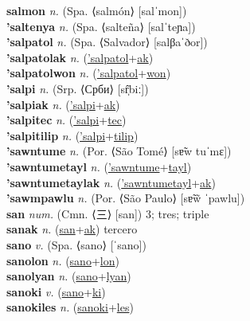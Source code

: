\textbf{salmon} \textit{n.} (Spa. ⟨salmón⟩ [salˈmon])
 \label{salmon} \\
\textbf{'saltenya} \textit{n.} (Spa. ⟨salteña⟩ [salˈteɲa])
 \label{'saltenya} \\
\textbf{'salpatol} \textit{n.} (Spa. ⟨Salvador⟩ [salβaˈðor])
 \label{'salpatol} \\
\textbf{'salpatolak} \textit{n.} (\hyperref['salpatol]{'salpatol}+\hyperref[ak]{ak})
 \label{'salpatolak} \\
\textbf{'salpatolwon} \textit{n.} (\hyperref['salpatol]{'salpatol}+\hyperref[won]{won})
 \label{'salpatolwon} \\
\textbf{'salpi} \textit{n.} (Srp. ⟨Срби⟩ [sr̩̂biː])
 \label{'salpi} \\
\textbf{'salpiak} \textit{n.} (\hyperref['salpi]{'salpi}+\hyperref[ak]{ak})
 \label{'salpiak} \\
\textbf{'salpitec} \textit{n.} (\hyperref['salpi]{'salpi}+\hyperref[tec]{tec})
 \label{'salpitec} \\
\textbf{'salpitilip} \textit{n.} (\hyperref['salpi]{'salpi}+\hyperref[tilip]{tilip})
 \label{'salpitilip} \\
\textbf{'sawntume} \textit{n.} (Por. ⟨São Tomé⟩ [sɐ̃w tuˈmɛ])
 \label{'sawntume} \\
\textbf{'sawntumetayl} \textit{n.} (\hyperref['sawntume]{'sawntume}+\hyperref[tayl]{tayl})
 \label{'sawntumetayl} \\
\textbf{'sawntumetaylak} \textit{n.} (\hyperref['sawntumetayl]{'sawntumetayl}+\hyperref[ak]{ak})
 \label{'sawntumetaylak} \\
\textbf{'sawmpawlu} \textit{n.} (Por. ⟨São Paulo⟩ [sɐ̃w̃ ˈpawlu])
 \label{'sawmpawlu} \\
\textbf{san} \textit{num.} (Cmn. ⟨三⟩ [san])
3; tres; triple \label{san} \\
\textbf{sanak} \textit{n.} (\hyperref[san]{san}+\hyperref[ak]{ak})
tercero \label{sanak} \\
\textbf{sano} \textit{v.} (Spa. ⟨sano⟩ [ˈsano])
 \label{sano} \\
\textbf{sanolon} \textit{n.} (\hyperref[sano]{sano}+\hyperref[lon]{lon})
 \label{sanolon} \\
\textbf{sanolyan} \textit{n.} (\hyperref[sano]{sano}+\hyperref[lyan]{lyan})
 \label{sanolyan} \\
\textbf{sanoki} \textit{v.} (\hyperref[sano]{sano}+\hyperref[ki]{ki})
 \label{sanoki} \\
\textbf{sanokiles} \textit{n.} (\hyperref[sanoki]{sanoki}+\hyperref[les]{les})
